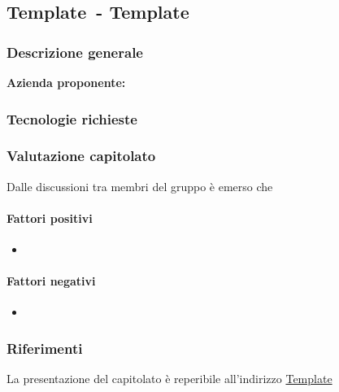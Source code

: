 
\renewcommand{\capName}{Template} %
\renewcommand{\capCode}{Template} %
\renewcommand{\capLink}{Template} %
\renewcommand{\capProposer}{Template} %


\subsection{\capCode\ - \capName} 
\subsubsection{Descrizione generale}
\textbf{Azienda proponente:}


\subsubsection{Tecnologie richieste}

\subsubsection{Valutazione capitolato}
Dalle discussioni tra membri del gruppo è emerso che

\paragraph{Fattori positivi}

\begin{itemize}
    \item 
\end{itemize}

\paragraph{Fattori negativi}

\begin{itemize}
    \item 
\end{itemize}

\subsubsection{Riferimenti}
La presentazione del capitolato è reperibile all'indirizzo \url{\capLink}
